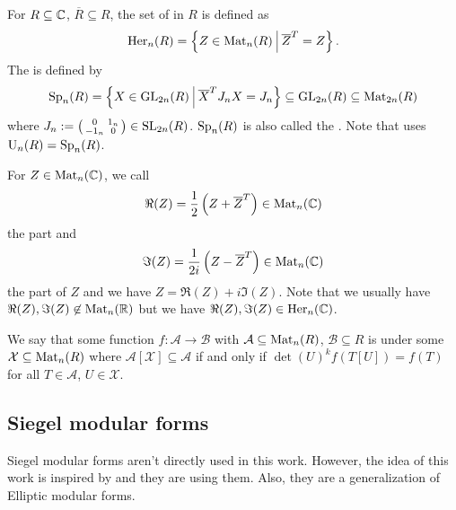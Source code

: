 For $R \subseteq \mathbb{C}$, $\overline{R} \subseteq R$, the set of  in $R$ is defined as
\[ \Her_n(R) = \Set{Z \in \M_n(R)}{\overline{Z}^T = Z} . \]
The  is defined by
\[ \Sp_n(R) = \Set{X \in \GL_{2n}(R)}{\overline{X}^T J_n X = J_n} \subseteq \GL_{2n}(R) \subseteq \M_{2n}(R) \] %
where $J_n := \left( \begin{smallmatrix} 0 & 1_n \\ -1_n & 0 \end{smallmatrix} \right) \in \operatorname{SL}_{2n}(R)$. %
$\operatorname{Sp}_n(R)$ is also called the . Note that \cite{Dern01Herm} uses $\operatorname{U}_n(R) = \operatorname{Sp}_n(R)$.

For $Z \in \operatorname{Mat}_n(\mathbb{C})$, we call
\[ \Re(Z) = \frac{1}{2} \left(Z + \overline{Z}^{T}\right) \in \operatorname{Mat}_n(\mathbb{C}) \]
the  part and
\[ \Im(Z) = \frac{1}{2i} \left(Z - \overline{Z}^{T}\right)  \in \operatorname{Mat}_n(\mathbb{C}) \]
the  part of $Z$ and we have $Z = \Re(Z) + i \Im(Z)$.
Note that we usually have $\Re(Z),\Im(Z) \not\in \operatorname{Mat}_n(\mathbb{R})$ but we have $\Re(Z),\Im(Z) \in \operatorname{Her}_n(\mathbb{C})$.

We say that some function $f \colon \mathcal{A} \rightarrow \mathcal{B}$ with $\mathcal{A} \subseteq \operatorname{Mat}_n(R)$, $\mathcal{B} \subseteq R$ is  under some $\mathcal{X} \subseteq \operatorname{Mat}_n(R)$ where $\mathcal{A}[\mathcal{X}] \subseteq \mathcal{A}$ if and only if $\det(U)^k f(T[U]) = f(T)$ for all $T \in \mathcal{A}$, $U \in \mathcal{X}$.


\subsection{Siegel modular forms}

Siegel modular forms aren't directly used in this work. However, the idea of this work is inspired by \cite{PoorYuen07Comp} and they are using them. Also, they are a generalization of Elliptic modular forms.

